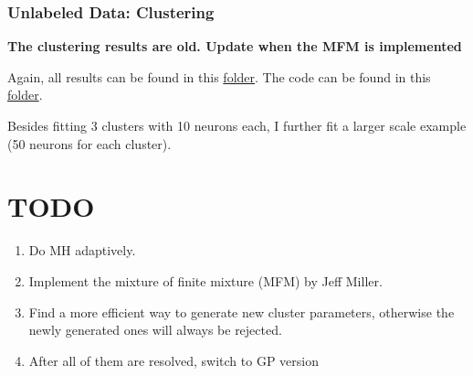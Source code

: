 \documentclass[]{article}
\begin{document}
\subsubsection{Unlabeled Data: Clustering}
\textbf{The clustering results are old. Update when the MFM is implemented}

Again, all results can be found in this \href{https://github.com/weigcdsb/state-space-clustering/tree/main/results/gif}{folder}. The code can be found in this \href{https://github.com/weigcdsb/state-space-clustering/tree/main/LDS/blkDiag}{folder}.

Besides fitting 3 clusters with 10 neurons each, I further fit a larger scale example (50 neurons for each cluster). 


\clearpage


\section{TODO}
\begin{enumerate}
	\def\labelenumi{(\arabic{enumi})}
	\item
	Do MH adaptively.
	\item
	Implement the mixture of finite mixture (MFM) by Jeff Miller.
	\item
	Find a more efficient way to generate new cluster parameters, otherwise the newly generated ones will always be rejected.
	\item
	After all of them are resolved, switch to GP version
	
\end{enumerate}
\end{document}
